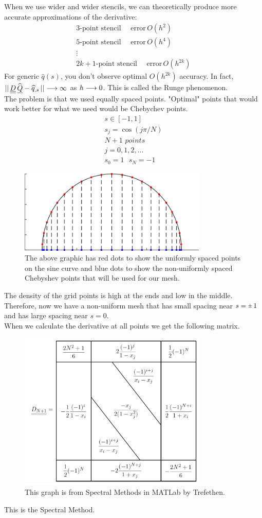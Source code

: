 When we use wider and wider stencils, we can theoretically produce more accurate approximations of the derivative:
\begin{align*}
\text{3-point stencil}\,\,\,\,\,\,\,\, \text{error}\,O(h^2) \\
\text{5-point stencil}\,\,\,\,\,\,\,\, \text{error}\,O(h^4) \\
\vdots\,\,\,\,\,\,\,\,\,\,\,\,\,\,\,\,\,\,\,\,\,\,\,\,\,\,\,\,\,\,\,\, \\
2k+1\text{-point stencil}\,\,\,\,\,\,\,\, \text{error}\,O(h^{2k})
\end{align*}
For generic $\widehat{q}(s)$, you don't observe optimal $O(h^{2k})$ accuracy. In fact, $|| \,{\underline{\underline{D}}}\,\widehat{{\underline{Q}}} - \widehat{q}_{,s}\, || \longrightarrow \infty$ as $h \longrightarrow 0$. This is called the Runge phenomenon. \\
The problem is that we used equally spaced points. 
"Optimal" points that would work better for what we need would be Chebychev points. 
\begin{align*}
s \in [-1,1] \\
s_j = \cos(j\pi/N) \\
N+1 \,\, points \\
j = 0, 1, 2, . . .  \\
s_0 = 1 \,\,\,\,
s_N = -1
\end{align*}
\begin{figure}[H]
\centering
\includegraphics[width=0.8\textwidth]{ChebyshevPoints.jpg}
\caption{The above graphic has red dots to show the uniformly spaced points on the sine curve and blue dots to show the non-uniformly spaced Chebyshev points that will be used for our mesh.}
\end{figure}
The density of the grid points is high at the ends and low in the middle. Therefore, now we have a non-uniform mesh that has small spacing near $s = \rpm\,1$ and has large spacing near $s = 0$.\\
When we calculate the derivative at all points we get the following matrix. \\
\begin{figure}[H]
\centering
\includegraphics[width=0.8\textwidth]{Chebyshev.jpg}
\caption{This graph is from Spectral Methods in MATLab by Trefethen.}
\end{figure}
This is the Spectral Method. 